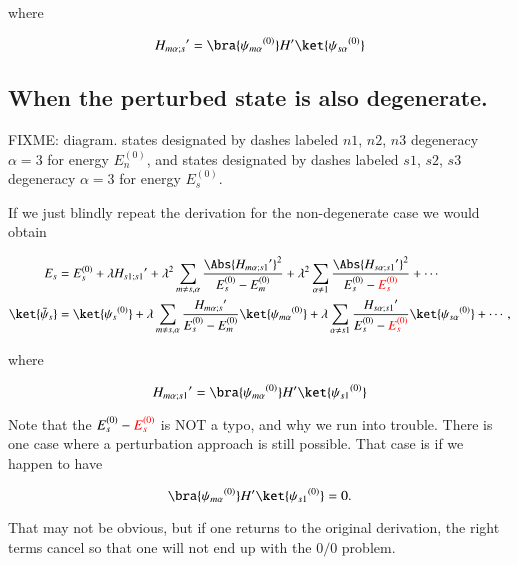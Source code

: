 where

\begin{equation}\label{eqn:qmTwoL5:30}
{H_{m \alpha ; s}}' =
\bra{{\psi_{m \alpha}}^{(0)}} H' \ket{{\psi_{s \alpha}}^{(0)}}
\end{equation}

\subsection{When the perturbed state is also degenerate.}

FIXME: diagram.  states designated by dashes labeled $n1$, $n2$, $n3$ degeneracy $\alpha = 3$ for energy $E_n^{(0)}$, and states designated by dashes labeled $s1$, $s2$, $s3$ degeneracy $\alpha = 3$ for energy $E_s^{(0)}$.

If we just blindly repeat the derivation for the non-degenerate case we would obtain

\begin{align}\label{eqn:qmTwoL5:50}
E_s &= E_s^{(0)} + \lambda {H_{s1 ; s1}}' 
+ \lambda^2 
\sum_{m \ne s, \alpha} 
\frac{\Abs{{H_{m \alpha ; s1}}'}^2 }
{ E_s^{(0)} - E_m^{(0)} } 
+ \lambda^2 
\sum_{\alpha \ne 1} 
\frac{\Abs{{H_{s \alpha ; s1}}'}^2 }
{ E_s^{(0)} - \color{red}{E_s^{(0)}} } 
+ \cdots
\\
\ket{\bar{\psi}_s} &= \ket{{\psi_s}^{(0)}} 
+ \lambda
\sum_{m \ne s, \alpha} 
\frac{{H_{m \alpha ; s}}'}
{ E_s^{(0)} - E_m^{(0)} } \ket{{\psi_{m \alpha}}^{(0)}}
+ \lambda
\sum_{\alpha \ne s1} 
\frac{{H_{s \alpha ; s1}}'}
{ E_s^{(0)} - \color{red}{E_s^{(0)}} } \ket{{\psi_{s \alpha}}^{(0)}}
+ \cdots,
\end{align}

where

\begin{equation}\label{eqn:qmTwoL5:70}
{H_{m \alpha ; s1}}' =
\bra{{\psi_{m \alpha}}^{(0)}} H' \ket{{\psi_{s1}}^{(0)}}
\end{equation}

Note that the $E_s^{(0)} -\color{red}{E_s^{(0)}}$ is NOT a typo, and why we run into trouble.  There is one case where a perturbation approach is still possible.  That case is if we happen to have

\begin{equation}\label{eqn:qmTwoL5:90}
\bra{{\psi_{m \alpha}}^{(0)}} H' \ket{{\psi_{s1}}^{(0)}} = 0.
\end{equation}

That may not be obvious, but if one returns to the original derivation, the right terms cancel so that one will not end up with the $0/0$ problem.


